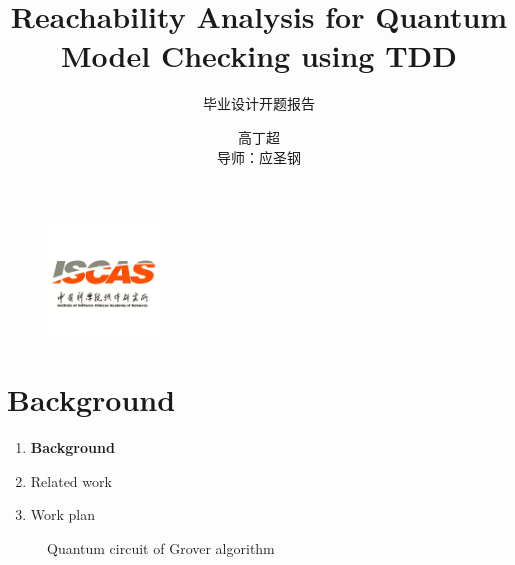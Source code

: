 \documentclass[aspectratio=1610,18pt]{ctexbeamer}
\title[TDD in quantum]{Reachability Analysis for Quantum Model Checking using TDD}
\subtitle{毕业设计开题报告}
\author{高丁超\\导师：应圣钢}
\begin{document}
\begin{frame}[plain]
  \titlepage
  \begin{figure}
    \centering
    \begin{minipage}[t]{0.48\textwidth}
    \centering
    \includegraphics[width=3cm]{iscas.png}
    \end{minipage}
  \end{figure}
\end{frame}
\section{Background}
\begin{frame}
  \begin{enumerate}
    \Large
    \item \textbf{Background}
    \item Related work
    \item Work plan
  \end{enumerate}
\end{frame}
\begin{frame}
  \begin{figure}[h]
    \centering
    \caption{\Large Quantum circuit of Grover algorithm}
    \end{figure}
\end{frame}
\end{document}

